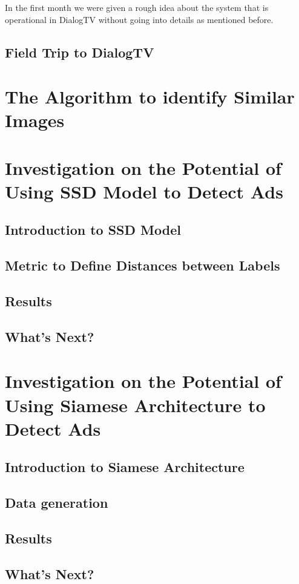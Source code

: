 In the first month we were given a rough idea about the system that is operational in DialogTV without going into details as mentioned before.

\subsection{Field Trip to DialogTV}

\section{The Algorithm to identify Similar Images}


\section{Investigation on the Potential of Using SSD Model to Detect Ads}
\subsection{Introduction to SSD Model}
\subsection{Metric to Define Distances between Labels}
\subsection{Results}
\subsection{What's Next?}

\section{Investigation on the Potential of Using Siamese Architecture to Detect Ads}
\subsection{Introduction to Siamese Architecture}
\subsection{Data generation}
\subsection{Results}
\subsection{What's Next?}